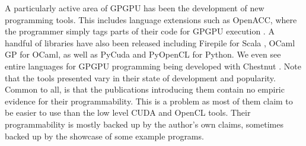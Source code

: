 A particularly active area of \gls{GPGPU} has been the development of new programming tools. 
This includes language extensions such as OpenACC, where the programmer simply tags parts of their code for \gls{GPGPU} execution \cite{wienke2012openacc}.
A handful of libraries have also been released including Firepile for Scala \cite{2011_firepile}, OCaml GP for OCaml\cite{bourgoin_2017_high}, as well as PyCuda and PyOpenCL for Python\cite{2012_pycuda_pyopencl}.
We even see entire languages for \gls{GPGPU} programming being developed with Chestnut \cite{stromme_2012_chestnut}.
Note that the tools presented vary in their state of development and popularity.
Common to all, is that the publications introducing them contain no empiric evidence for their programmability.
This is a problem as most of them claim to be easier to use than the low level CUDA and OpenCL tools.
Their programmability is mostly backed up by the author’s own claims, sometimes backed up by the showcase of some example programs. 
